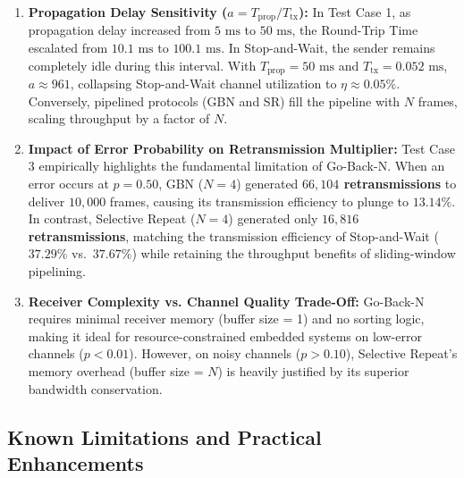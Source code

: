 \documentclass[11pt,a4paper]{article}
\begin{document}
\begin{enumerate}
    \item \textbf{Propagation Delay Sensitivity (\(a = T_{\text{prop}} / T_{\text{tx}}\)):} In Test Case 1, as propagation delay increased from \(5\text{ ms}\) to \(50\text{ ms}\), the Round-Trip Time escalated from \(10.1\text{ ms}\) to \(100.1\text{ ms}\). In Stop-and-Wait, the sender remains completely idle during this interval. With \(T_{\text{prop}} = 50\text{ ms}\) and \(T_{\text{tx}} = 0.052\text{ ms}\), \(a \approx 961\), collapsing Stop-and-Wait channel utilization to \(\eta \approx 0.05\%\). Conversely, pipelined protocols (GBN and SR) fill the pipeline with \(N\) frames, scaling throughput by a factor of \(N\).

    \item \textbf{Impact of Error Probability on Retransmission Multiplier:} Test Case 3 empirically highlights the fundamental limitation of Go-Back-N. When an error occurs at \(p = 0.50\), GBN (\(N=4\)) generated \textbf{\(66{,}104\) retransmissions} to deliver \(10{,}000\) frames, causing its transmission efficiency to plunge to \(13.14\%\). In contrast, Selective Repeat (\(N=4\)) generated only \textbf{\(16{,}816\) retransmissions}, matching the transmission efficiency of Stop-and-Wait (\(37.29\%\) vs.\ \(37.67\%\)) while retaining the throughput benefits of sliding-window pipelining.

    \item \textbf{Receiver Complexity vs. Channel Quality Trade-Off:} Go-Back-N requires minimal receiver memory (buffer size = 1) and no sorting logic, making it ideal for resource-constrained embedded systems on low-error channels (\(p < 0.01\)). However, on noisy channels (\(p > 0.10\)), Selective Repeat's memory overhead (buffer size = \(N\)) is heavily justified by its superior bandwidth conservation.
\end{enumerate}

\subsection{Known Limitations and Practical Enhancements}
\end{document}
